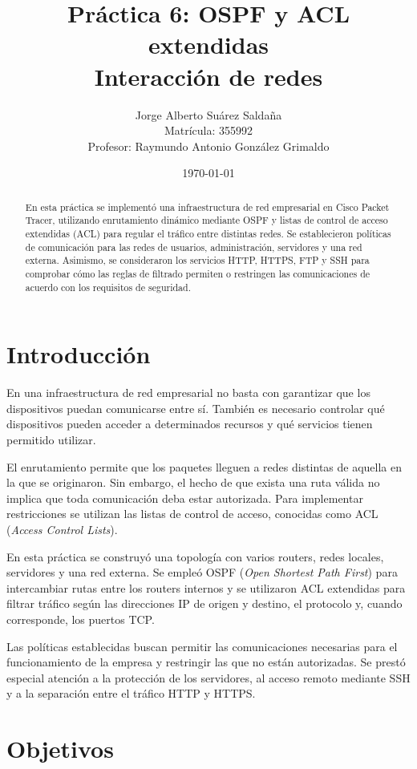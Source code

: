 \documentclass[12pt,a4paper]{article}
\title{
    Práctica 6: \textbf{OSPF y ACL extendidas}\\[0.5em]
    \large Interacción de redes
}
\author{
    Jorge Alberto Suárez Saldaña\\
    \small Matrícula: 355992\\
    \small Profesor: Raymundo Antonio González Grimaldo
}
\date{\today}
\begin{document}
\maketitle

\begin{abstract}
En esta práctica se implementó una infraestructura de red empresarial
en Cisco Packet Tracer, utilizando enrutamiento dinámico mediante OSPF
y listas de control de acceso extendidas (ACL) para regular el tráfico
entre distintas redes. Se establecieron políticas de comunicación para
las redes de usuarios, administración, servidores y una red externa.
Asimismo, se consideraron los servicios HTTP, HTTPS, FTP y SSH
para comprobar cómo las reglas de filtrado permiten o restringen
las comunicaciones de acuerdo con los requisitos de seguridad.
\end{abstract}

\section{Introducción}

En una infraestructura de red empresarial no basta con garantizar que
los dispositivos puedan comunicarse entre sí. También es necesario
controlar qué dispositivos pueden acceder a determinados recursos y
qué servicios tienen permitido utilizar.

El enrutamiento permite que los paquetes lleguen a redes distintas
de aquella en la que se originaron. Sin embargo, el hecho de que exista
una ruta válida no implica que toda comunicación deba estar autorizada.
Para implementar restricciones se utilizan las listas de control de
acceso, conocidas como ACL (\textit{Access Control Lists}).

En esta práctica se construyó una topología con varios routers,
redes locales, servidores y una red externa. Se empleó OSPF
(\textit{Open Shortest Path First}) para intercambiar rutas entre
los routers internos y se utilizaron ACL extendidas para filtrar
tráfico según las direcciones IP de origen y destino, el protocolo
y, cuando corresponde, los puertos TCP.

Las políticas establecidas buscan permitir las comunicaciones
necesarias para el funcionamiento de la empresa y restringir las
que no están autorizadas. Se prestó especial atención a la protección
de los servidores, al acceso remoto mediante SSH y a la separación
entre el tráfico HTTP y HTTPS.

\section{Objetivos}
\end{document}
